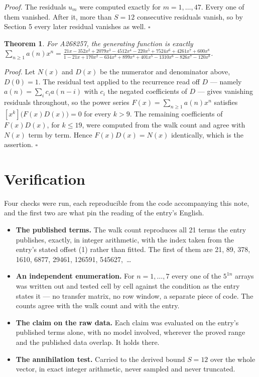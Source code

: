 \documentclass[11pt]{article}
\newtheorem{theorem}{Theorem}
\theoremstyle{definition}
\begin{document}
{\itshape Proof.} The residuals $u_m$ were computed exactly for $m = 1,\dots,47$. Every one of them vanished. After it, more than $S = 12$ consecutive residuals vanish, so by Section 5 every later residual vanishes as well. $\square$

\begin{theorem} For A268257, the generating function is exactly $\sum_{n\ge 1} a(n)x^n = \frac{21x - 352x^{2} + 2079x^{3} - 4512x^{4} - 220x^{5} + 7524x^{6} + 4261x^{7} + 600x^{8}}{1 - 21x + 170x^{2} - 634x^{3} + 899x^{4} + 401x^{5} - 1310x^{6} - 826x^{7} - 120x^{8}}$.\end{theorem}

{\itshape Proof.} Let $N(x)$ and $D(x)$ be the numerator and denominator above, $D(0)=1$. The residual test applied to the recurrence read off $D$ --- namely $a(n) = \sum_i c_i a(n-i)$ with $c_i$ the negated coefficients of $D$ --- gives vanishing residuals throughout, so the power series $F(x)=\sum_{n\ge 1}a(n)x^n$ satisfies $[x^k]\bigl(F(x)D(x)\bigr) = 0$ for every $k > 9$. The remaining coefficients of $F(x)D(x)$, for $k \le 19$, were computed from the walk count and agree with $N(x)$ term by term. Hence $F(x)D(x) = N(x)$ identically, which is the assertion. $\square$

\section{Verification}

Four checks were run, each reproducible from the code accompanying this note, and the first two are what pin the reading of the entry's English.

\begin{itemize}

\item {\bfseries The published terms.} The walk count reproduces all 21 terms the entry publishes, exactly, in integer arithmetic, with the index taken from the entry's stated offset (1) rather than fitted. The first of them are 21, 89, 378, 1610, 6877, 29461, 126591, 545627,~\dots

\item {\bfseries An independent enumeration.} For $n = 1,\dots,7$ every one of the $5^{1n}$ arrays was written out and tested cell by cell against the condition as the entry states it --- no transfer matrix, no row window, a separate piece of code. The counts agree with the walk count and with the entry.

\item {\bfseries The claim on the raw data.} Each claim was evaluated on the entry's published terms alone, with no model involved, wherever the proved range and the published data overlap. It holds there.

\item {\bfseries The annihilation test.} Carried to the derived bound $S = 12$ over the whole vector, in exact integer arithmetic, never sampled and never truncated.

\end{itemize}
\end{document}
